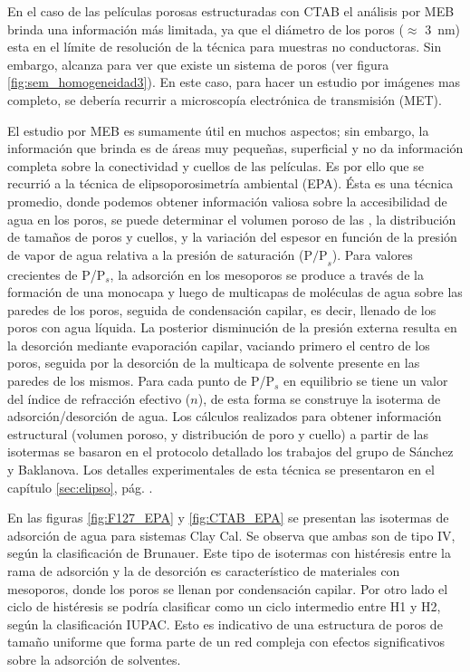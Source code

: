 		 En el caso de las películas porosas estructuradas con CTAB el análisis por MEB brinda una información más limitada, ya que el diámetro de los poros ($\approx$ \SI{3}{\nm}) esta en el límite de resolución de la técnica para muestras no conductoras. Sin embargo, alcanza para  ver que existe un sistema de poros (ver figura \ref{fig:sem_homogeneidad3}). En este caso, para hacer un estudio por imágenes mas completo, se debería recurrir a microscopía electrónica de transmisión (MET).

		 El estudio por MEB es sumamente útil en muchos aspectos; sin embargo, la información que brinda es de áreas muy pequeñas, superficial y no da información completa sobre la conectividad y cuellos de las películas. Es por ello que se recurrió a la técnica de elipsoporosimetría ambiental (EPA). Ésta es una técnica promedio, donde podemos obtener información valiosa sobre la accesibilidad de agua en los poros, se puede determinar el volumen poroso de las \pdm, la distribución de tamaños de poros y cuellos, y la variación del espesor en función de la presión de vapor de agua relativa a la presión de saturación ($\text{P/P}_s$). Para valores crecientes de P/P$_s$, la adsorción en los mesoporos se produce a través de la formación de una monocapa y luego de multicapas de moléculas de agua sobre las paredes de los poros, seguida de condensación capilar, es decir, llenado de los poros con agua líquida. La posterior disminución de la presión externa resulta en la desorción mediante evaporación capilar, vaciando primero el centro de los poros, seguida por la desorción de la multicapa de solvente presente en las paredes de los mismos. Para cada punto de P/P$_s$ en equilibrio se tiene un valor del índice de refracción efectivo ($n$), de esta forma se construye la isoterma de adsorción/desorción de agua. Los cálculos realizados para obtener información estructural (volumen poroso, y distribución de poro y cuello) a partir de las isotermas se basaron en el protocolo detallado los trabajos del grupo de Sánchez y Baklanova\cite{Baklanov2000,Boissiere2005,Sakatani2006}. Los detalles experimentales de esta técnica se presentaron en el capítulo \ref{sec:elipso}, pág. \pageref{sec:elipso}.

		 En las figuras \ref{fig:F127_EPA} y \ref{fig:CTAB_EPA} se presentan las isotermas de adsorción de agua para sistemas Cla\pdmF\space y Cal\pdmC. Se observa que ambas son de tipo IV, según la clasificación de Brunauer\cite{Gregg1967,Violi2015,Fuertes2010}. Este tipo de isotermas con histéresis entre la rama de adsorción y la de desorción es característico de materiales con mesoporos, donde los poros se llenan por condensación capilar. Por otro lado el ciclo de histéresis se podría clasificar como un ciclo intermedio entre H1 y H2, según la clasificación IUPAC\cite{Thommes2015}. Esto es indicativo de una estructura de poros de tamaño uniforme que forma parte de un red compleja con efectos significativos sobre la adsorción de solventes.\cite{Thommes2015,Gregg1967,Lowell2004,Sing1985}

